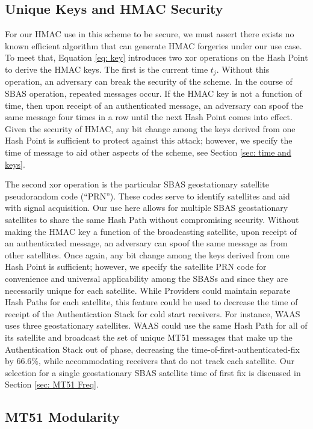 \documentclass[letterpaper,times]{IONconf/IONconf}
\begin{document}
\subsection{Unique Keys and HMAC Security} \label{sec: HMAC security}

For our HMAC use in this scheme to be secure, we must assert there exists no known efficient algorithm that can generate HMAC forgeries under our use case.
To meet that, Equation \ref{eq: key} introduces two xor operations on the Hash Point to derive the HMAC keys.
The first is the current time $t_j$.
Without this operation, an adversary can break the security of the scheme.
In the course of SBAS operation, repeated messages occur.
If the HMAC key is not a function of time, then upon receipt of an authenticated message, an adversary can spoof the same message four times in a row until the next Hash Point comes into effect.
Given the security of HMAC, any bit change among the keys derived from one Hash Point is sufficient to protect against this attack; however, we specify the time of message to aid other aspects of the scheme, see Section \ref{sec: time and keys}.

The second xor operation is the particular SBAS geostationary satellite pseudorandom code (``PRN'').
These codes serve to identify satellites and aid with signal acquisition.
Our use here allows for multiple SBAS geostationary satellites to share the same Hash Path without compromising security.
Without making the HMAC key a function of the broadcasting satellite, upon receipt of an authenticated message, an adversary can spoof the same message as from other satellites.
Once again, any bit change among the keys derived from one Hash Point is sufficient; however, we specify the satellite PRN code for convenience and universal applicability among the SBASs and since they are necessarily unique for each satellite.
While Providers could maintain separate Hash Paths for each satellite, this feature could be used to decrease the time of receipt of the Authentication Stack for cold start receivers.
For instance, WAAS uses three geostationary satellites.
WAAS could use the same Hash Path for all of its satellite and broadcast the set of unique MT51 messages that make up the Authentication Stack out of phase, decreasing the time-of-first-authenticated-fix by 66.6\%, while accommodating receivers that do not track each satellite.
Our selection for a single geostationary SBAS satellite time of first fix is discussed in Section \ref{sec: MT51 Freq}.

\subsection{MT51 Modularity} \label{sec: MT51 modularity}
\end{document}

